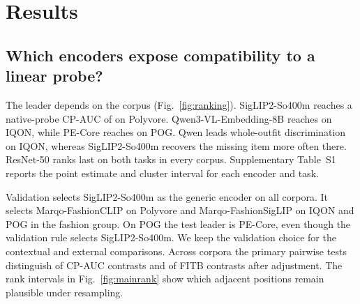 \section{Results}

\subsection{Which encoders expose compatibility to a linear probe?}
The leader depends on the corpus (Fig.~\ref{fig:ranking}). SigLIP2-So400m reaches a native-probe CP-AUC of \resPolyvoreVTwoCleanSiglipTwoSoFourZeroZeromThreeEightFourNativeLogisticTestCpAuc{} on Polyvore. Qwen3-VL-Embedding-8B reaches \resIqonThreeZeroZeroZeroVTwoCleanQwenThreeVlEmbEightbNativeLogisticTestCpAuc{} on IQON, while PE-Core reaches \resPogVTwoCleanPeCoreLOneFourThreeThreeSixNativeLogisticTestCpAuc{} on POG. Qwen leads whole-outfit discrimination on IQON, whereas SigLIP2-So400m recovers the missing item more often there. ResNet-50 ranks last on both tasks in every corpus. Supplementary Table~S1 reports the point estimate and cluster interval for each encoder and task.

Validation selects SigLIP2-So400m as the generic encoder on all corpora. It selects Marqo-FashionCLIP on Polyvore and Marqo-FashionSigLIP on IQON and POG in the fashion group. On POG the test leader is PE-Core, even though the validation rule selects SigLIP2-So400m. We keep the validation choice for the contextual and external comparisons. Across corpora the primary pairwise tests distinguish \resHolmSigPrimary{} of \resHolmComparisonsPrimary{} CP-AUC contrasts and \resHolmSigPrimaryFitb{} of \resHolmComparisonsPrimaryFitb{} FITB contrasts after adjustment. The rank intervals in Fig.~\ref{fig:mainrank} show which adjacent positions remain plausible under resampling.


